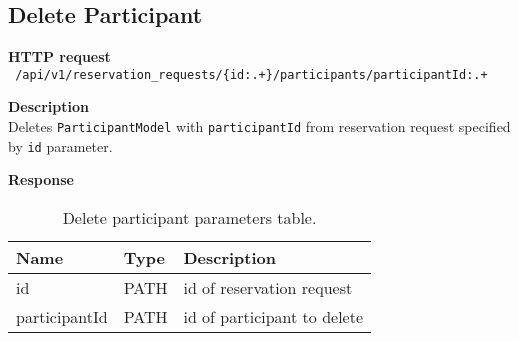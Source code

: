\subsection{Delete Participant}
\begin{description}
    \item \textbf{HTTP request}\\
        \texttt{\text{[DELETE]} /api/v1/reservation\_requests/\{id:.+\}/participants/{participantId:.+}}
    \item \textbf{Description}\\
        Deletes \texttt{ParticipantModel} with \texttt{participantId} from reservation request specified by \texttt{id} parameter.
    \item \textbf{Response}\\
        \texttt{\text{[200 OK]}}
\end{description}
\begin{table}[ht!]
    \begin{tabularx}{\textwidth}{llX}
        \toprule
        Name & Type & Description \\
        \midrule
        id & PATH & id of reservation request \\
        participantId & PATH & id of participant to delete \\
        \bottomrule
        \end{tabularx}
    \caption{Delete participant parameters table.}
\end{table}
